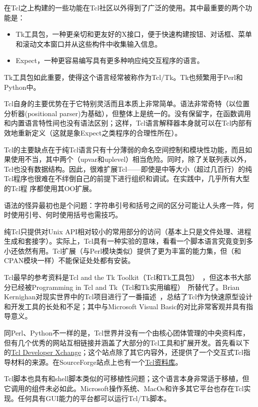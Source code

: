 \documentclass[12pt,oneside]{ctexbook}
\begin{document}
\begin{common-format}
在Tcl之上构建的一些功能在Tcl社区以外得到了广泛的使用。其中最重要的两个功能是：
\begin{itemize}
\item Tk工具包，一种更亲切和更友好的X接口，便于快速构建按钮、对话框、菜单和滚动文本窗口并从这些构件中收集输入信息。
\item Expect，一种更容易编写具有更多种响应纯交互程序的语言。
\end{itemize}

Tk工具包如此重要，使得这个语言经常被称作为Tcl/Tk。Tk也频繁用于Perl和Python中。

Tcl自身的主要优势在于它特别灵活而且本质上非常简单。语法非常奇特（以位置分析器(positional parser)为基础），但整体上是统一的。没有保留字，在函数调用和内置语言特性间也没有语法区别；这样，Tcl语言解释器本身就可以在Tcl内部有效地重新定义（这就是象Expect之类程序的合理性所在）。

Tcl的主要缺点在于纯Tcl语言只有十分薄弱的命名空间控制和模块性功能，而且如果使用不当，其中两个（upvar和uplevel）相当危险。同时，除了关联列表以外，Tcl也没有数据结构。因此，很难扩展Tcl——即使是中等大小（超过几百行）的纯Tcl程序也很难在不绊倒自己的前提下进行组织和调试。在实践中，几乎所有大型的Tcl程
序都使用其OO扩展。

语法的怪异最初也是个问题：字符串引号和括号之间的区分可能让人头疼一阵，何时使用引号、何时使用括号也需技巧。

纯Tcl只提供对Unix API相对较小的常用部分的访问（基本上只是文件处理、进程生成和套接字）。实际上，Tcl具有一种实验的意味，看看一个脚本语言究竟变到多小还依然有用。Tcl扩展（与Perl模块类似）提供了更为丰富的能力集，但（和CPAN模块一样）不能保证处处都有安装。

Tcl最早的参考资料是Tcl and the Tk Toolkit（Tcl和Tk工具包）~\cite{Ousterhout94}，但这本书大部分已经被Programming in Tcl and Tk（Tcl和Tk实用编程）~\cite{Welch}所替代了。Brian Kernighan对现实世界中的Tcl项目进行了一番描述~\cite{Kernighan95}，总结了Tcl作为快速原型设计和开发工具的长处和不足；其中与Microsoft Visual Basic的对比非常客观并具有指导意义。

同Perl、Python不一样的是，Tcl世界并没有一个由核心团体管理的中央资料库，但有几个优秀的网站互相链接并涵盖了大部分的Tcl工具和扩展开发。首先看以下的\href{http://www.tcltk.com/}{Tcl Developer Xchange}；这个站点除了其它内容外，还提供了一个交互式Tcl指导材料的来源。在SourceForge站点上也有一个\href{http://sourceforge.net/foundry/tcl-foundry/}{Tcl资料库}。

Tcl脚本也具有和shell脚本类似的可移植性问题；这个语言本身非常适于移植，但它调用的组件未必如此。Microsoft操作系统、MacOs和许多其它平台也存在Tcl实现。任何具有GUI能力的平台都可以运行Tcl/Tk脚本。


\end{common-format}
\end{document}
